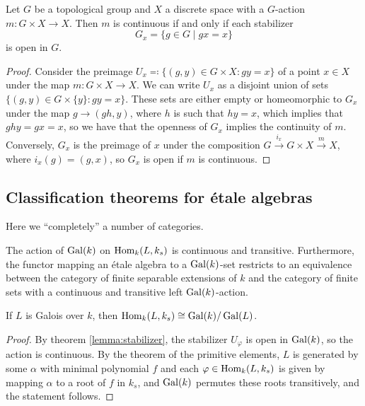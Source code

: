 \begin{lemma}\label{lemma:stabilizer}
	Let $G$ be a topological group and $X$ a discrete space with a $G$-action $m \colon G \times X \to X$. Then $m$ is continuous if and only if each stabilizer
	\[
		G_x = \{ g \in G \mid gx = x \}
	\]
	is open in $G$.
\end{lemma}

\begin{proof}
	Consider the preimage $U_x \eqqcolon \{ (g,y) \in G \times X \colon gy = x\}$ of a point $x \in X$ under the map $m: G \times X \to X$. We can write $U_x$ as a disjoint union of sets $\{(g,y) \in G \times \{y\} \colon gy = x\}$. These sets are either empty or homeomorphic to $G_x$ under the map $g \to (gh, y)$, where $h$ is such that $hy = x$, which implies that $ghy = gx = x$, so we have that the openness of $G_x$ implies the continuity of $m$. Conversely, $G_x$ is the preimage of $x$ under the composition $G \xrightarrow{i_x} G \times X \xrightarrow{m} X$, where $i_x(g) = (g,x)$, so $G_x$ is open if $m$ is continuous.
\end{proof}

\subsection{Classification theorems for \'etale algebras}
Here we ``completely'' a number of categories.
\begin{proposition}
	The action of $\operatorname{Gal}(k)$ on $\operatorname{Hom}_k(L, k_s)$ is continuous and transitive. Furthermore, the functor mapping an \'etale algebra to a $\operatorname{Gal}(k)$-set restricts to an equivalence between the category of finite separable extensions of $k$ and the category of finite sets with a continuous and transitive left $\operatorname{Gal}(k)$-action.
\end{proposition}

\begin{corollary}
	If $L$ is Galois over $k$, then $\operatorname{Hom}_k(L,k_s) \cong \operatorname{Gal}(k)/\operatorname{Gal}(L)$.
\end{corollary}

\begin{proof}
	By theorem \ref{lemma:stabilizer}, the stabilizer $U_\varphi$ is open in $\operatorname{Gal}(k)$, so the action is continuous. By the theorem of the primitive elements, $L$ is generated by some $\alpha$ with minimal polynomial $f$ and each $\varphi \in \operatorname{Hom}_k(L,k_s)$ is given by mapping $\alpha$ to a root of $f$ in $k_s$, and $\operatorname{Gal}(k)$ permutes these roots transitively, and the statement follows.
\end{proof}\\

